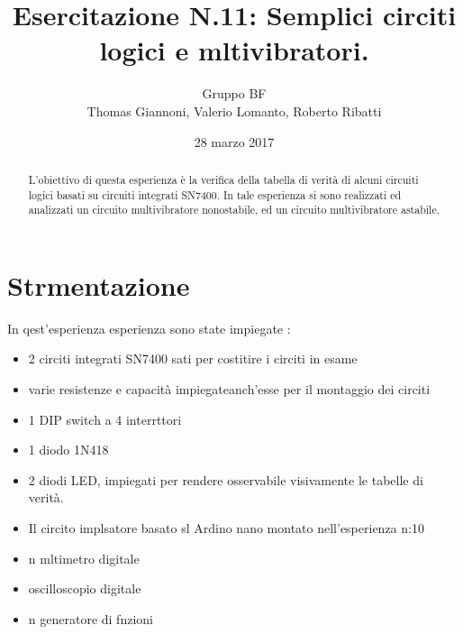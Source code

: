 \documentclass[a4paper,11pt]{article}
\author{Gruppo BF \\ Thomas Giannoni, Valerio Lomanto, Roberto Ribatti}
\title{Esercitazione N.11: Semplici circiti logici e mltivibratori.}
\date{28 marzo 2017}
\begin{document}
\maketitle
\begin{abstract}
	L'obiettivo di questa esperienza è la verifica della tabella di verità di alcuni circuiti logici basati su circuiti integrati SN7400.
	In tale esperienza si sono realizzati ed analizzati un circuito multivibratore nonostabile, ed un circuito multivibratore astabile.


\end{abstract}

\section{Strmentazione}
In qest'esperienza esperienza sono state impiegate :
\begin{itemize}
	\item 2 circiti integrati SN7400 sati per costitire i circiti in esame
	\item varie resistenze e capacità impiegateanch'esse per il montaggio dei circiti
	\item 1 DIP switch a 4 interrttori
	\item 1 diodo 1N418
	\item 2 diodi LED, impiegati per rendere osservabile visivamente le tabelle di verità. 
	\item Il circito implsatore basato sl Ardino nano montato nell'esperienza n:10
	\item n mltimetro digitale
	\item oscilloscopio digitale 
	\item n generatore di fnzioni
\end{itemize}
\end{document}
